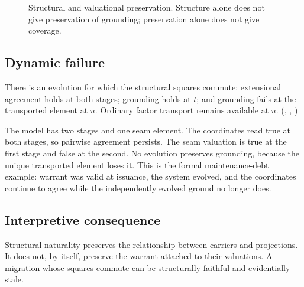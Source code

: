 \begin{figure}[t]
\centering
{}
\caption{Structural and valuational preservation. Structure alone does not give preservation of grounding; preservation alone does not give coverage.}
\label{fig:dynamic}
\end{figure}

\subsection{Dynamic failure}
\begin{theorem}\label{thm:dynfail}
There is an evolution for which the structural squares commute; extensional agreement holds at both stages; grounding holds at $t$; and grounding fails at the transported element at $u$. Ordinary factor transport remains available at $u$. (, , )
\end{theorem}
The model has two stages and one seam element. The coordinates read true at both stages, so pairwise agreement persists. The seam valuation is true at the first stage and false at the second. No evolution preserves grounding, because the unique transported element loses it. This is the formal maintenance-debt example: warrant was valid at issuance, the system evolved, and the coordinates continue to agree while the independently evolved ground no longer does.

\subsection{Interpretive consequence}
Structural naturality preserves the relationship between carriers and projections. It does not, by itself, preserve the warrant attached to their valuations. A migration whose squares commute can be structurally faithful and evidentially stale.
